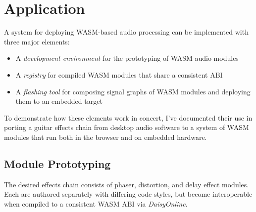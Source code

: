 \chapter{ Application }
\label{sec:application}





A system for deploying WASM-based audio processing can be implemented with three major elements:

\begin{itemize}
  \item A \textit{development environment} for the prototyping of WASM audio modules
  \item A \textit{registry} for compiled WASM modules that share a consistent ABI
  \item A \textit{flashing tool} for composing signal graphs of WASM modules
  and deploying them to an embedded target
\end{itemize}

To demonstrate how these elements work in concert, I've documented their use 
in porting a guitar effects chain from desktop audio software 
to a system of WASM modules that run both in the browser and on embedded hardware.

\section{ Module Prototyping }

The desired effects chain consists of phaser, distortion, and delay effect modules. 
Each are authored separately with differing code styles, 
but become interoperable when compiled to a consistent WASM ABI via \textit{DaisyOnline}.

